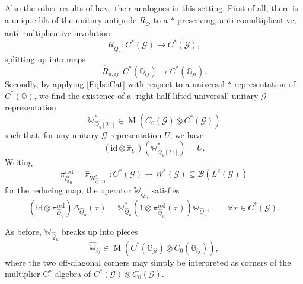 \documentclass[reqno]{amsart}
\numberwithin{equation}{section}
\newcommand{\mcB}{\mathcal{B}}
\newcommand{\id}{\mathrm{id}}
\newcommand{\G}{\mathbb{G}}
\newcommand{\msG}{\mathscr{G}}
\newcommand{\red}{\mathrm{red}}
\newcommand{\Mult}{\operatorname{M}}
\newcommand{\ww}{\mathrm{W}}
\newcommand{\Ww}{\mathds{W}}
\begin{document}
Also the other results of \cite{Kus01} have their analogues in this setting. First of all, there is a unique lift of the unitary antipode $R_{\hat{Q}}$ to a $*$-preserving, anti-comultiplicative, anti-multiplicative involution 
\begin{equation}\label{EqUnitaryAntipodeUnivQgr}
R_{\hat{Q}_u}\colon C^*(\msG) \rightarrow C^*(\msG),
\end{equation}
splitting up into maps 
\[
\hat{R}_{u,ij}\colon C^*(\G_{ij})\rightarrow C^*(\G_{ji}). 
\]
Secondly, by applying \eqref{EqIsoCat} with respect to a universal $*$-representation of $C^*(\G)$, we find the existence of a `right half-lifted universal' unitary $\msG$-representation 
\begin{equation}\label{EqHalfUniversalLift}
\Ww_{\hat{Q}_u[21]}^* \in \Mult(C_0(\msG)\otimes C^*(\msG))
\end{equation}
such that, for any unitary $\msG$-representation $U$, we have 
\begin{equation}\label{EqUnivPropUnivLift}
(\id\otimes \hat{\pi}_{U})(\Ww_{\hat{Q}_u[21]}^*) = U.
\end{equation}
Writing 
\[
\pi^{\red}_{\hat{Q}_u} = \hat{\pi}_{\ww_{\hat{Q}[21]}^*}\colon C^*(\msG) \rightarrow W^*(\msG) \subseteq \mcB(L^2(\msG))
\]
for the reducing map, the operator $\Ww_{\hat{Q}_u}$ satisfies 
\begin{equation}\label{EqHalfUniversalRepQgr}
(\id\otimes \pi_{\hat{Q}_u}^{\red})\Delta_{\hat{Q}_u}(x) =
\Ww_{\hat{Q}_u}^*(1\otimes \pi^{\red}_{\hat{Q}_u}(x))\Ww_{\hat{Q}_u},\qquad \forall x\in C^*(\msG). 
\end{equation}

As before, $\Ww_{\hat{Q}_u}$ breaks up into pieces
\begin{equation}\label{EqPiecesUniversal}
\hat{\Ww}_{ij} \in \Mult(C^*(\G_{ji})\otimes C_0(\G_{ij})),
\end{equation}
where the two off-diagonal corners may simply be interpreted as corners of the multiplier C$^*$-algebra of $C^*(\msG)\otimes C_0(\msG)$.
\end{document}
